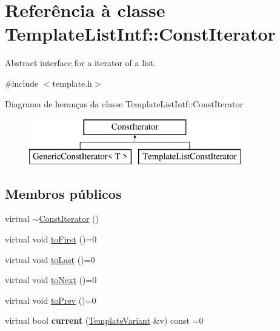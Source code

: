 \hypertarget{class_template_list_intf_1_1_const_iterator}{\section{Referência à classe Template\-List\-Intf\-:\-:Const\-Iterator}
\label{class_template_list_intf_1_1_const_iterator}
}


Abstract interface for a iterator of a list.  




{\ttfamily \#include $<$template.\-h$>$}

Diagrama de heranças da classe Template\-List\-Intf\-:\-:Const\-Iterator\begin{figure}[H]
\begin{center}
\leavevmode
\includegraphics[height=2.000000cm]{class_template_list_intf_1_1_const_iterator}
\end{center}
\end{figure}
\subsection*{Membros públicos}
\begin{DoxyCompactItemize}
\item 
virtual \hyperlink{class_template_list_intf_1_1_const_iterator_ad4923f0e0089c0ca746b52e980367068}{$\sim$\-Const\-Iterator} ()
\item 
virtual void \hyperlink{class_template_list_intf_1_1_const_iterator_a86b87aa42e3e820d2c21ae552bd0a55d}{to\-First} ()=0
\item 
virtual void \hyperlink{class_template_list_intf_1_1_const_iterator_a9c80b2b75a3575aeea8a5b211119c6d3}{to\-Last} ()=0
\item 
virtual void \hyperlink{class_template_list_intf_1_1_const_iterator_a03ab44b53fe4f1b143b50a3ff118c831}{to\-Next} ()=0
\item 
virtual void \hyperlink{class_template_list_intf_1_1_const_iterator_a35c099174eca466a4277050c864efc8e}{to\-Prev} ()=0
\item 
\hypertarget{class_template_list_intf_1_1_const_iterator_ae3b4de44e9fb449d7052cb15cdb14d08}{virtual bool {\bfseries current} (\hyperlink{class_template_variant}{Template\-Variant} \&v) const =0}\label{class_template_list_intf_1_1_const_iterator_ae3b4de44e9fb449d7052cb15cdb14d08}

\end{DoxyCompactItemize}


